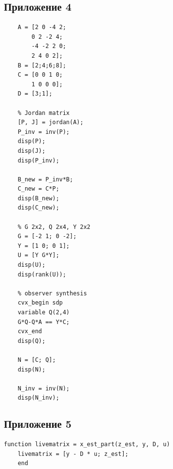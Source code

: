 \documentclass[a4paper, 12pt]{article}
\begin{document}
    \subsection{Приложение 4}
    \begin{lstlisting}[label=task4, caption={Программа для четвертого задания}]
    % input data
    A = [2 0 -4 2;
        0 2 -2 4;
        -4 -2 2 0;
        2 4 0 2];
    B = [2;4;6;8];
    C = [0 0 1 0;
        1 0 0 0];
    D = [3;1];

    % Jordan matrix
    [P, J] = jordan(A);
    P_inv = inv(P);
    disp(P);
    disp(J);
    disp(P_inv);

    B_new = P_inv*B;
    C_new = C*P;
    disp(B_new);
    disp(C_new);

    % G 2x2, Q 2x4, Y 2x2
    G = [-2 1; 0 -2];
    Y = [1 0; 0 1];
    U = [Y G*Y];
    disp(U);
    disp(rank(U));

    % observer synthesis
    cvx_begin sdp
    variable Q(2,4)
    G*Q-Q*A == Y*C;
    cvx_end
    disp(Q);

    N = [C; Q];
    disp(N);

    N_inv = inv(N);
    disp(N_inv);
    \end{lstlisting}


    \subsection{Приложение 5}
    \begin{lstlisting}[label=task42, caption={Параметры блока \texttt{MATLAB Function} (задание 4)}]
    function livematrix = x_est_part(z_est, y, D, u)
    livematrix = [y - D * u; z_est];
    end
    \end{lstlisting}
\end{document}
